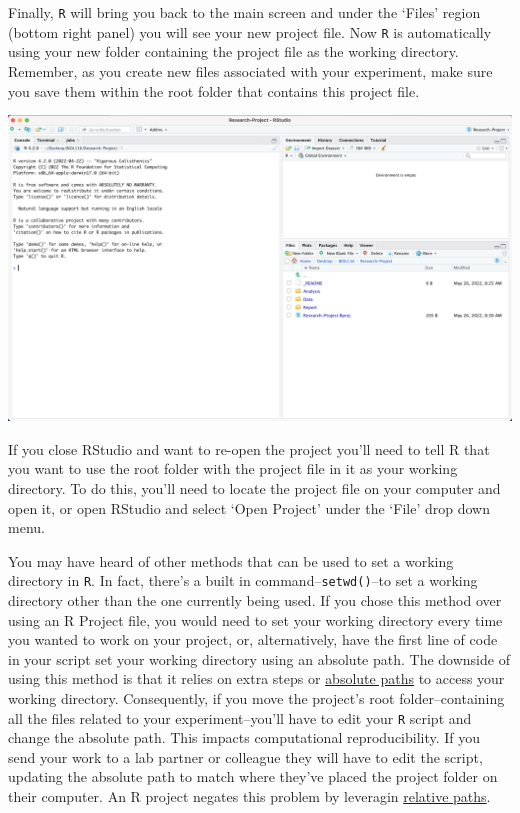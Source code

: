 \documentclass[
]{book}
\begin{document}
Finally, \texttt{R} will bring you back to the main screen and under the `Files' region (bottom right panel) you will see your new project file. Now \texttt{R} is automatically using your new folder containing the project file as the working directory. Remember, as you create new files associated with your experiment, make sure you save them within the root folder that contains this project file.

\includegraphics{images/D_new-project-old-folder-5.png}

If you close RStudio and want to re-open the project you'll need to tell R that you want to use the root folder with the project file in it as your working directory. To do this, you'll need to locate the project file on your computer and open it, or open RStudio and select `Open Project' under the `File' drop down menu.

You may have heard of other methods that can be used to set a working directory in \texttt{R}. In fact, there's a built in command--\texttt{setwd()}--to set a working directory other than the one currently being used. If you chose this method over using an R Project file, you would need to set your working directory every time you wanted to work on your project, or, alternatively, have the first line of code in your script set your working directory using an absolute path. The downside of using this method is that it relies on extra steps or \href{https://ubco-biology.github.io/Procedures-and-Guidelines/relative-and-absolute-paths}{absolute paths} to access your working directory. Consequently, if you move the project's root folder--containing all the files related to your experiment--you'll have to edit your \texttt{R} script and change the absolute path. This impacts computational reproducibility. If you send your work to a lab partner or colleague they will have to edit the script, updating the absolute path to match where they've placed the project folder on their computer. An R project negates this problem by leveragin \href{https://ubco-biology.github.io/Procedures-and-Guidelines/relative-and-absolute-paths}{relative paths}.
\end{document}
